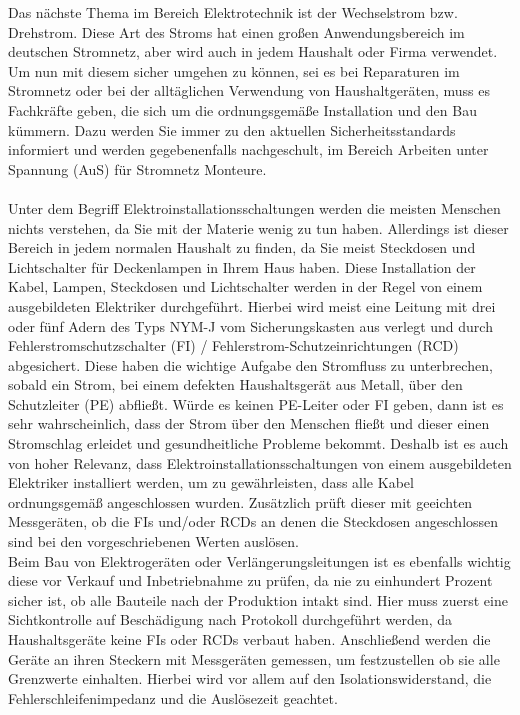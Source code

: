 Das nächste Thema im Bereich Elektrotechnik ist der Wechselstrom bzw. Drehstrom. Diese Art des Stroms hat einen großen Anwendungsbereich im deutschen 
Stromnetz, aber wird auch in jedem Haushalt oder Firma verwendet. Um nun mit diesem sicher umgehen zu können, sei es bei Reparaturen im Stromnetz oder
bei der alltäglichen Verwendung von Haushaltgeräten, muss es Fachkräfte geben, die sich um die ordnungsgemäße Installation und den Bau kümmern. 
Dazu werden Sie immer zu den aktuellen Sicherheitsstandards informiert und werden gegebenenfalls nachgeschult, \zB im Bereich Arbeiten unter Spannung (AuS) 
für Stromnetz Monteure.
\\\\
Unter dem Begriff Elektroinstallationsschaltungen werden die meisten Menschen nichts verstehen, da Sie mit der Materie wenig zu tun haben. Allerdings ist dieser 
Bereich in jedem normalen Haushalt zu finden, da Sie meist Steckdosen und Lichtschalter für Deckenlampen in Ihrem Haus haben. Diese Installation der Kabel, 
Lampen, Steckdosen und Lichtschalter werden in der Regel von einem ausgebildeten Elektriker durchgeführt. Hierbei wird meist eine Leitung mit drei oder 
fünf Adern des Typs NYM-J vom Sicherungskasten aus verlegt und durch Fehlerstromschutzschalter (FI) / Fehlerstrom-Schutzeinrichtungen (RCD) abgesichert. 
Diese haben die wichtige Aufgabe den Stromfluss zu unterbrechen, sobald ein Strom, \zB bei einem defekten Haushaltsgerät aus Metall, über den Schutzleiter (PE) 
abfließt. Würde es keinen PE-Leiter oder FI geben, dann ist es sehr wahrscheinlich, dass der Strom über den Menschen fließt und dieser einen Stromschlag 
erleidet und gesundheitliche Probleme bekommt. Deshalb ist es auch von hoher Relevanz, dass Elektroinstallationsschaltungen von einem ausgebildeten Elektriker 
installiert werden, um zu gewährleisten, dass alle Kabel ordnungsgemäß angeschlossen wurden. Zusätzlich prüft dieser mit geeichten Messgeräten, ob die 
FIs und/oder RCDs an denen die Steckdosen angeschlossen sind bei den vorgeschriebenen Werten auslösen.\\
Beim Bau von Elektrogeräten oder Verlängerungsleitungen ist es ebenfalls wichtig diese vor Verkauf und Inbetriebnahme zu prüfen, da nie zu einhundert 
Prozent sicher ist, ob alle Bauteile nach der Produktion intakt sind. Hier muss zuerst eine Sichtkontrolle auf Beschädigung nach Protokoll durchgeführt 
werden, da Haushaltsgeräte keine FIs oder RCDs verbaut haben. Anschließend werden die Geräte an ihren Steckern mit Messgeräten gemessen, um festzustellen 
ob sie alle Grenzwerte einhalten. Hierbei wird vor allem auf den Isolationswiderstand, die Fehlerschleifenimpedanz und die Auslösezeit geachtet.\\
